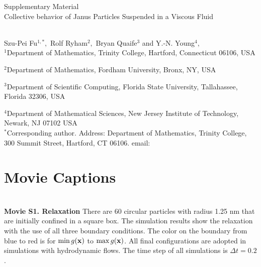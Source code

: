 
\thispagestyle{empty}

\newpage
{\Large \bf

  \noindent Supplementary Material\\

  \noindent 
  Collective behavior of Janus Particles  Suspended in a Viscous Fluid}\\

\noindent 
Szu-Pei Fu$^{1,*},$ 
Rolf Ryham$^{2},$ 
Bryan Quaife$^{3}$ and Y.-N. Young$^{4},$
\\

\noindent
$^{1}$Department of Mathematics, Trinity College, Hartford, Connecticut 06106, USA

\noindent
$^{2}$Department of Mathematics, Fordham University,  Bronx, NY, USA

\noindent
$^{3}$Department of Scientific Computing, Florida State University, Tallahassee, Florida 32306, USA

\noindent
$^{4}$Department of Mathematical Sciences, New Jersey Institute of Technology, Newark, NJ  07102 USA
\\

\noindent $^*$Corresponding author. Address: Department of Mathematics, Trinity College, 
300 Summit Street, Hartford, CT 06106. email: 



\setcounter{page}{1}

\setcounter{figure}{0}
\renewcommand{\thefigure}{S\arabic{figure}}

\setcounter{equation}{0}
\renewcommand{\theequation}{S\arabic{equation}}

\setcounter{section}{0}
\renewcommand{\thesection}{S\arabic{section}}   





\sloppy
\section{Movie Captions}\mbox{} \\

\noindent
{\bf Movie S1. Relaxation} 
There are 60 circular particles with radius 1.25 nm that are initially confined in a square box.
The simulation results show the relaxation with the use of all three boundary conditions.
The color on the boundary from blue to red
is for $\min g(\mathbf{x})$ to $\max g(\mathbf{x})$.
All final configurations are adopted in 
simulations with hydrodynamic flows.
The time step of all simulations is $\Delta t=0.2$.\\


